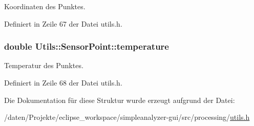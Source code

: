 Koordinaten des Punktes. 



Definiert in Zeile 67 der Datei utils.\-h.

\hypertarget{structUtils_1_1SensorPoint_a764d6572f865138b36cb46c910001e9a}{
\subsubsection[{temperature}]{\setlength{\rightskip}{0pt plus 5cm}double Utils\-::\-Sensor\-Point\-::temperature}}\label{structUtils_1_1SensorPoint_a764d6572f865138b36cb46c910001e9a}


Temperatur des Punktes. 



Definiert in Zeile 68 der Datei utils.\-h.



Die Dokumentation für diese Struktur wurde erzeugt aufgrund der Datei\-:\begin{DoxyCompactItemize}
\item 
/daten/\-Projekte/eclipse\-\_\-workspace/simpleanalyzer-\/gui/src/processing/\hyperlink{utils_8h}{utils.\-h}\end{DoxyCompactItemize}
